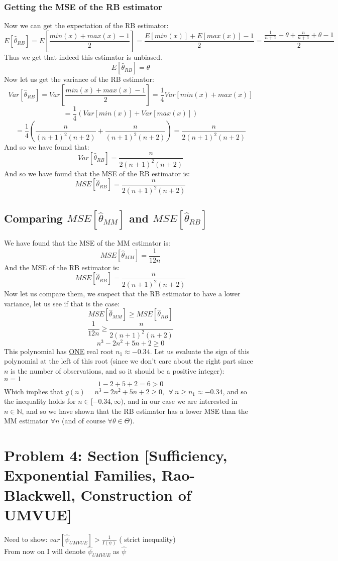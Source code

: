 \documentclass[12pt]{article}
\begin{document}
\subsubsection*{Getting the MSE of the RB estimator}
Now we can get the expectation of the RB estimator:
\[
E[\hat{\theta}_{RB}] = E[\frac{min(x)+max(x)-1}{2}] = \frac{E[min(x)]+E[max(x)]-1}{2} = \frac{\frac{1}{n+1} + \theta + \frac{n}{n+1} + \theta - 1}{2} 
\]
Thus we get that indeed this estimator is unbiased. \\
\[
E[\hat{\theta}_{RB}] = \theta
\]
Now let us get the variance of the RB estimator:
\[
Var[\hat{\theta}_{RB}] = Var[\frac{min(x)+max(x)-1}{2}] = \frac{1}{4}Var[min(x)+max(x)]
\]
\[
  = \frac{1}{4}(Var[min(x)]+Var[max(x)])
\]
\[
= \frac{1}{4}(\frac{n}{(n+1)^2(n+2)} + \frac{n}{(n+1)^2(n+2)}) = \frac{n}{2(n+1)^2(n+2)}
\]
And so we have found that: 
\[
Var[\hat{\theta}_{RB}] = \frac{n}{2(n+1)^2(n+2)}
\]
And so we have found that the MSE of the RB estimator is:
\[
MSE[\hat{\theta}_{RB}] = \frac{n}{2(n+1)^2(n+2)}
\]
\subsection*{Comparing $MSE[\hat{\theta}_{MM}]$ and $MSE[\hat{\theta}_{RB}]$}
We have found that the MSE of the MM estimator is:
\[
MSE[\hat{\theta}_{MM}] = \frac{1}{12n}
\]
And the MSE of the RB estimator is:
\[
MSE[\hat{\theta}_{RB}] = \frac{n}{2(n+1)^2(n+2)}
\]
Now let us compare them, we suspect that the RB estimator to have a lower variance, let us see if that is the case:
\[
MSE[\hat{\theta}_{MM}] \geq  MSE[\hat{\theta}_{RB}]
\]
\[
  \frac{1}{12n} \geq \frac{n}{2(n+1)^2(n+2)}
\]
\[
n^3 - 2n^2 + 5n +2 \geq 0
\]
This polynomial has \underline{ONE} real root $n_1 \approx -0.34$. Let us evaluate the sign of this polynomial at the left of this root (since we don't care about the right part since $n$ is the number of observations, and so it should be a positive integer):\\
\textbf{$n=1$}
\[
1 - 2 + 5 + 2 = 6 > 0
\]
Which implies that $g(n) = n^3 -2n^2 + 5n +2 \geq 0, \ \ \forall \ n \geq n_1 \approx -0.34$, and so the inequality holds for $n \in [-0.34, \infty)$, and in our case we are interested in $n \in \mathbb{N}$, and so we have shown that the RB estimator has a lower MSE than the MM estimator $\forall n$ (and of course $\forall \theta \in \Theta$).
\section*{Problem 4: Section [Sufficiency, Exponential Families, Rao-Blackwell, Construction of UMVUE]}
Need to show: $var[\hat{\psi}_{UMVUE}] > \frac{1}{I(\psi)}$ ( strict inequality)\\
From now on I will denote $\hat{\psi}_{UMVUE}$ as $\hat{\psi}$\\
\end{document}
